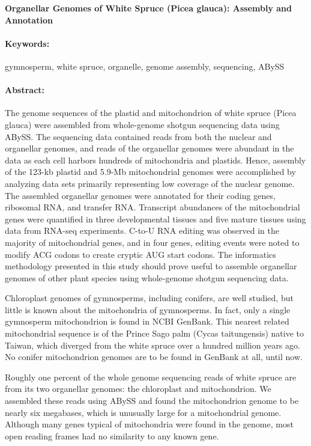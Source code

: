 \noindent
\large {\bf Organellar Genomes of White Spruce (Picea glauca): Assembly and Annotation} 


\normalsize 


\noindent \paragraph{Keywords:} gymnosperm, white spruce, organelle, genome assembly, sequencing, ABySS

\noindent \paragraph{Abstract:} 

The genome sequences of the plastid and mitochondrion of white spruce (Picea glauca) were
assembled from whole-genome shotgun sequencing data using ABySS. The sequencing data
contained reads from both the nuclear and organellar genomes, and reads of the organellar
genomes were abundant in the data as each cell harbors hundreds of mitochondria and plastids.
Hence, assembly of the 123-kb plastid and 5.9-Mb mitochondrial genomes were accomplished by
analyzing data sets primarily representing low coverage of the nuclear genome. The assembled
organellar genomes were annotated for their coding genes, ribosomal RNA, and transfer RNA.
Transcript abundances of the mitochondrial genes were quantified in three developmental tissues
and five mature tissues using data from RNA-seq experiments. C-to-U RNA editing was observed
in the majority of mitochondrial genes, and in four genes, editing events were noted to modify
ACG codons to create cryptic AUG start codons. The informatics methodology presented in
this study should prove useful to assemble organellar genomes of other plant species using
whole-genome shotgun sequencing data.

Chloroplast genomes of gymnosperms, including conifers, are well studied, but little is known
about the mitochondria of gymnosperms. In fact, only a single gymnosperm mitochondrion is
found in NCBI GenBank. This nearest related mitochondrial sequence is of the Prince Sago palm
(Cycas taitungensis) native to Taiwan, which diverged from the white spruce over a hundred
million years ago. No conifer mitochondrion genomes are to be found in GenBank at all, until
now.

Roughly one percent of the whole genome sequencing reads of white spruce are from its two
organellar genomes: the chloroplast and mitochondrion. We assembled these reads using ABySS
and found the mitochondrion genome to be nearly six megabases, which is unusually large for a
mitochondrial genome. Although many genes typical of mitochondria were found in the genome,
most open reading frames had no similarity to any known gene.

